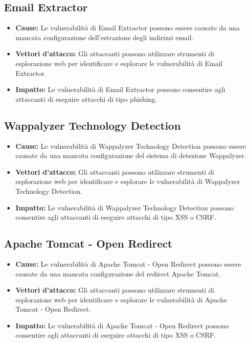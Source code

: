 \subsection{Email Extractor}
\begin{itemize}
\item \textbf{Cause:} Le vulnerabilità di Email Extractor possono essere causate da una mancata configurazione dell'estrazione degli indirizzi email.
\item \textbf{Vettori d'attacco:} Gli attaccanti possono utilizzare strumenti di esplorazione web per identificare e esplorare le vulnerabilità di Email Extractor.
\item \textbf{Impatto:} Le vulnerabilità di Email Extractor possono consentire agli attaccanti di eseguire attacchi di tipo phishing.
\end{itemize}
\subsection{Wappalyzer Technology Detection}
\begin{itemize}
\item \textbf{Cause:} Le vulnerabilità di Wappalyzer Technology Detection possono essere causate da una mancata configurazione del sistema di detezione Wappalyzer.
\item \textbf{Vettori d'attacco:} Gli attaccanti possono utilizzare strumenti di esplorazione web per identificare e esplorare le vulnerabilità di Wappalyzer Technology Detection.
\item \textbf{Impatto:} Le vulnerabilità di Wappalyzer Technology Detection possono consentire agli attaccanti di eseguire attacchi di tipo XSS o CSRF.
\end{itemize}
\subsection{Apache Tomcat - Open Redirect}
\begin{itemize}
\item \textbf{Cause:} Le vulnerabilità di Apache Tomcat - Open Redirect possono essere causate da una mancata configurazione del redirect Apache Tomcat.
\item \textbf{Vettori d'attacco:} Gli attaccanti possono utilizzare strumenti di esplorazione web per identificare e esplorare le vulnerabilità di Apache Tomcat - Open Redirect.
\item \textbf{Impatto:} Le vulnerabilità di Apache Tomcat - Open Redirect possono consentire agli attaccanti di eseguire attacchi di tipo XSS o CSRF.
\end{itemize}
